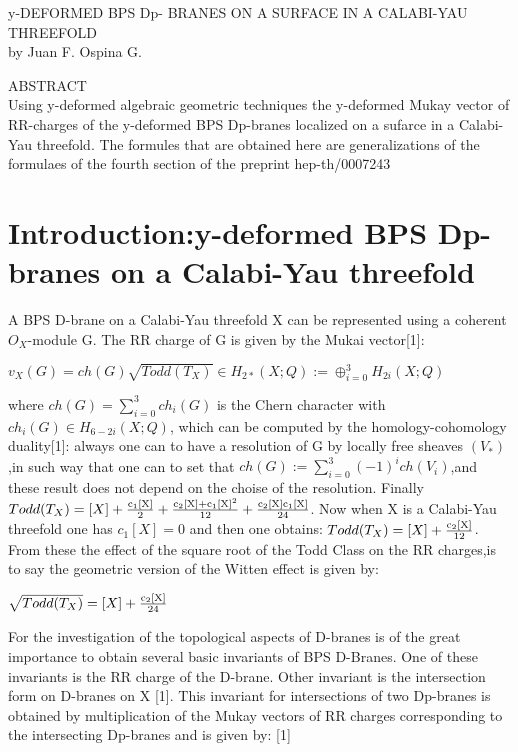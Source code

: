 \documentclass[a4paper,a4paper]{article}
\begin{document}
\begin{center}
y-DEFORMED BPS Dp- BRANES ON A SURFACE  IN A CALABI-YAU THREEFOLD\\ [.25in]
by Juan F. Ospina G.
\end{center}
\begin{center}
ABSTRACT \\ [.25in]
Using y-deformed algebraic geometric techniques the y-deformed Mukay vector of RR-charges of the y-deformed BPS Dp-branes localized on a sufarce in a Calabi-Yau threefold. The formules that are obtained here are generalizations of the formulaes of the fourth section of the preprint hep-th/0007243
\end{center}

\section{Introduction:y-deformed BPS Dp-branes on a Calabi-Yau threefold}
\setlength{\baselineskip}{20pt}


A BPS D-brane on a Calabi-Yau threefold X can be represented using a  coherent $O_{X}$-module G. The RR charge of G is given by the Mukai vector[1]:
\begin{center}
{  $ v_{X}(G)=ch(G)\sqrt{Todd(T_{X})}{\in}H_{2*}(X;Q):={\oplus}_{i=0}^3H_{2i}(X;Q)  $ }
\end{center}

where $ ch(G)= \sum_{i=0}^{3}ch_{i}(G)$ is the Chern character with $ ch_{i}(G){\in}H_{6-2i}(X;Q)$, which can be computed by the homology-cohomology duality[1]:  always one can to have a resolution of G by locally free sheaves  $(V_{*}) $,in such way that one can to set that
$ ch(G):= \sum_{i=0}^{3}(-1)^ich(V_i)$,and these result does not depend on the choise of the resolution. Finally  $Todd(T_{X})=[X]+\frac{\rm c_{1}[X]}{\rm 2}+\frac{\rm c_{2}[X]+c_{1}[X]^2}{\rm 12}+\frac{\rm c_{2}[X]c_{1}[X]}{\rm 24} $. Now when X is a Calabi-Yau threefold one has $c_{1}[X]=0
   $ and then one obtains: $Todd(T_{X})=[X]+\frac{\rm c_{2}[X]}{\rm 12}$.
From these the effect of the square root of the Todd Class on the RR charges,is to say the geometric version of the Witten effect is given by:
\begin{center}
{  $\sqrt{Todd(T_{X})} =[X]+\frac{\rm c_{2}[X]}{\rm 24} $ }
\end{center}

For the investigation of the topological aspects of D-branes is of the great importance to obtain several basic invariants of BPS D-Branes. One of these invariants is the RR charge of the D-brane. Other invariant is the intersection form on D-branes on X [1]. This invariant for intersections of 
two Dp-branes is obtained by multiplication of the Mukay vectors of RR charges corresponding to the intersecting Dp-branes and is given by: [1]
 
\end{document}
